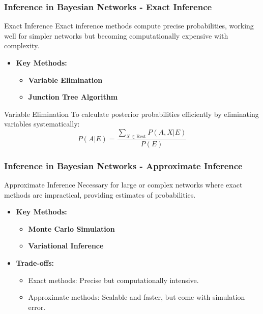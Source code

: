 \documentclass[aspectratio=169]{beamer}
\begin{document}
\begin{frame}[fragile]
    \frametitle{Inference in Bayesian Networks - Exact Inference}
    \begin{block}{Exact Inference}
        Exact inference methods compute precise probabilities, working well for simpler networks but becoming computationally expensive with complexity.
    \end{block}
    \begin{itemize}
        \item \textbf{Key Methods:}
        \begin{itemize}
            \item \textbf{Variable Elimination}
            \item \textbf{Junction Tree Algorithm}
        \end{itemize}
    \end{itemize}
    \begin{block}{Variable Elimination}
        To calculate posterior probabilities efficiently by eliminating variables systematically:
        \begin{equation}
            P(A | E) = \frac{\sum_{X \in \text{Rest}} P(A, X | E)}{P(E)}
        \end{equation}
    \end{block}
\end{frame}

\begin{frame}[fragile]
    \frametitle{Inference in Bayesian Networks - Approximate Inference}
    \begin{block}{Approximate Inference}
        Necessary for large or complex networks where exact methods are impractical, providing estimates of probabilities.
    \end{block}
    \begin{itemize}
        \item \textbf{Key Methods:}
        \begin{itemize}
            \item \textbf{Monte Carlo Simulation}
            \item \textbf{Variational Inference}
        \end{itemize}
    \end{itemize}
    \begin{itemize}
        \item \textbf{Trade-offs:}
        \begin{itemize}
            \item Exact methods: Precise but computationally intensive.
            \item Approximate methods: Scalable and faster, but come with simulation error.
        \end{itemize}
    \end{itemize}
\end{frame}
\end{document}
